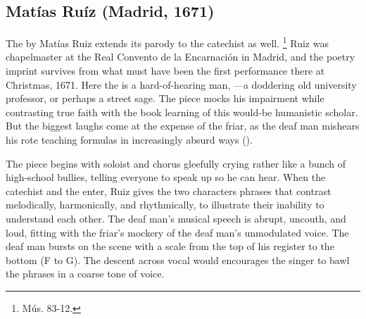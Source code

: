 \subsection{Matías Ruíz (Madrid, 1671)}

The  by Matías Ruiz extends its parody to the catechist as well.%
\footnote{\signature{E-E}{Mús. 83-12}.}
Ruiz was chapelmaster at the Real Convento de la Encarnación in Madrid, and the poetry imprint survives from what must have been the first performance there at Christmas, 1671.%
\autocite{1671-Madrid-Enc-Nav}
Here the  is a hard-of-hearing man, ---a doddering old university professor, or perhaps a street sage.
The piece mocks his impairment while contrasting true faith with the book learning of this would-be humanistic scholar.
But the biggest laughs come at the expense of the friar, as the deaf man mishears his rote teaching formulas in increasingly absurd ways ().


The piece begins with soloist and chorus gleefully crying   rather like a bunch of high-school bullies, telling everyone to speak up so he can hear.
When the catechist and the  enter, Ruiz gives the two characters phrases that contrast melodically, harmonically, and rhythmically, to illustrate their inability to understand each other.
The deaf man's musical speech is abrupt, uncouth, and loud, fitting with the friar's mockery of the deaf man's unmodulated voice.
The deaf man bursts on the scene with a scale from the top of his register to the bottom (F to G).
The descent across vocal  would encourages the singer to bawl the phrases in a coarse tone of voice.



